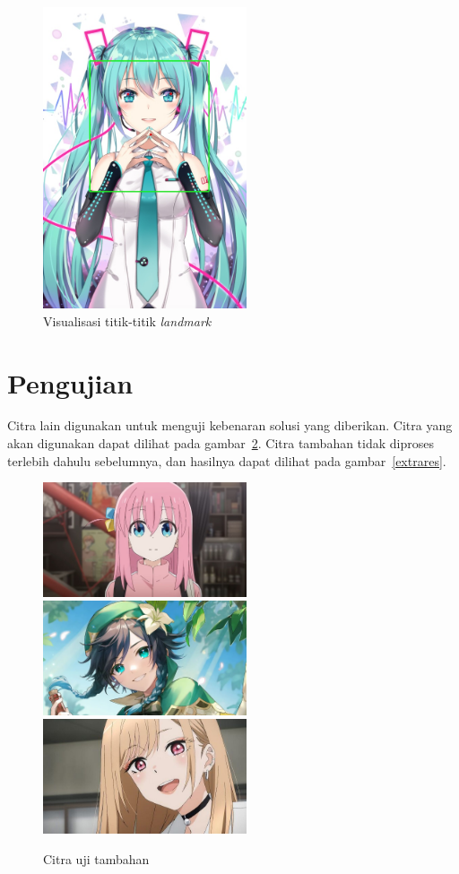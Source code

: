 \documentclass[conference, a4paper]{IEEEtran}
\begin{document}
\begin{figure}[ht]
  \begin{center}
    \includegraphics[width=6cm]{img/result.jpg}
  \end{center}
  \caption{Visualisasi titik-titik \textit{landmark}}\label{landmark}
\end{figure}

\section{Pengujian}
Citra lain digunakan untuk menguji kebenaran solusi yang diberikan. Citra yang akan digunakan dapat dilihat pada gambar~\ref{extratests}. Citra tambahan tidak diproses terlebih dahulu sebelumnya, dan hasilnya dapat dilihat pada gambar~\ref{extrares}.

\begin{figure}[h]
  \begin{center}
    \includegraphics[width=6cm]{img/bocchi.jpg}
    \includegraphics[width=6cm]{img/venti.jpg}
    \includegraphics[width=6cm]{img/marin.jpg}
  \end{center}
  \caption{Citra uji tambahan}\label{extratests}
\end{figure}
\end{document}
